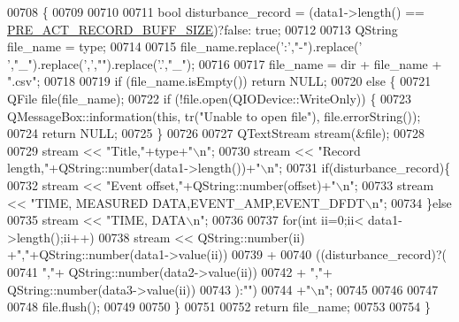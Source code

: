 \begin{DoxyCode}
00708 \{
00709 
00710 
00711     \textcolor{keywordtype}{bool} disturbance\_record = (data1->length() == \hyperlink{a00003_a18dcecc16ded13fa622e0913e73442e6}{PRE\_ACT\_RECORD\_BUFF\_SIZE})?\textcolor{keyword}{false}:\textcolor{keyword}{
      true};
00712 
00713     QString file\_name = type;
00714 
00715     file\_name.replace(\textcolor{charliteral}{':'},\textcolor{stringliteral}{"-"}).replace(\textcolor{charliteral}{' '},\textcolor{stringliteral}{"\_"}).replace(\textcolor{charliteral}{','},\textcolor{stringliteral}{""}).replace(\textcolor{charliteral}{'.'},\textcolor{stringliteral}{"\_"});
00716 
00717     file\_name = dir + file\_name + \textcolor{stringliteral}{".csv"};
00718 
00719     \textcolor{keywordflow}{if} (file\_name.isEmpty()) \textcolor{keywordflow}{return} NULL;
00720     \textcolor{keywordflow}{else} \{
00721         QFile file(file\_name);
00722         \textcolor{keywordflow}{if} (!file.open(QIODevice::WriteOnly)) \{
00723             QMessageBox::information(\textcolor{keyword}{this}, tr(\textcolor{stringliteral}{"Unable to open file"}), file.errorString());
00724             \textcolor{keywordflow}{return} NULL;
00725         \}
00726 
00727         QTextStream stream(&file);
00728 
00729         stream << \textcolor{stringliteral}{"Title,"}+type+\textcolor{stringliteral}{"\(\backslash\)n"};
00730         stream << \textcolor{stringliteral}{"Record length,"}+QString::number(data1->length())+\textcolor{stringliteral}{"\(\backslash\)n"};
00731         \textcolor{keywordflow}{if}(disturbance\_record)\{
00732         stream << \textcolor{stringliteral}{"Event offset,"}+QString::number(offset)+\textcolor{stringliteral}{"\(\backslash\)n"};
00733         stream << \textcolor{stringliteral}{"TIME, MEASURED DATA,EVENT\_AMP,EVENT\_DFDT\(\backslash\)n"};
00734         \}\textcolor{keywordflow}{else}
00735         stream << \textcolor{stringliteral}{"TIME, DATA\(\backslash\)n"};
00736 
00737         \textcolor{keywordflow}{for}(\textcolor{keywordtype}{int} ii=0;ii< data1->length();ii++)
00738            stream << QString::number(ii) +\textcolor{stringliteral}{","}+QString::number(data1->value(ii))
00739                      +
00740                      ((disturbance\_record)?(
00741                      \textcolor{stringliteral}{","}+ QString::number(data2->value(ii))
00742                      + \textcolor{stringliteral}{","}+ QString::number(data3->value(ii))
00743                      ):\textcolor{stringliteral}{""})
00744                      +\textcolor{stringliteral}{"\(\backslash\)n"};
00745 
00746 
00747 
00748         file.flush();
00749 
00750      \}
00751 
00752     \textcolor{keywordflow}{return} file\_name;
00753 
00754 \}
\end{DoxyCode}
